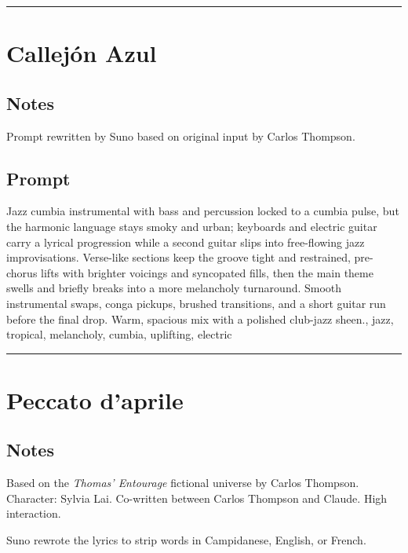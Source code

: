 \begin{center}\rule{0.5\linewidth}{0.5pt}\end{center}

\section{Callejón Azul}\label{callejuxf3n-azul}

\subsection{Notes}\label{notes-9}

Prompt rewritten by Suno based on original input by Carlos Thompson.

\subsection{Prompt}\label{prompt}

Jazz cumbia instrumental with bass and percussion locked to a cumbia
pulse, but the harmonic language stays smoky and urban; keyboards and
electric guitar carry a lyrical progression while a second guitar slips
into free-flowing jazz improvisations. Verse-like sections keep the
groove tight and restrained, pre-chorus lifts with brighter voicings and
syncopated fills, then the main theme swells and briefly breaks into a
more melancholy turnaround. Smooth instrumental swaps, conga pickups,
brushed transitions, and a short guitar run before the final drop. Warm,
spacious mix with a polished club-jazz sheen., jazz, tropical,
melancholy, cumbia, uplifting, electric

\begin{center}\rule{0.5\linewidth}{0.5pt}\end{center}

\section{Peccato d'aprile}\label{peccato-daprile}

\subsection{Notes}\label{notes-10}

Based on the \emph{Thomas' Entourage} fictional universe by Carlos
Thompson. Character: Sylvia Lai. Co-written between Carlos Thompson and
Claude. High interaction.

Suno rewrote the lyrics to strip words in Campidanese, English, or
French.

